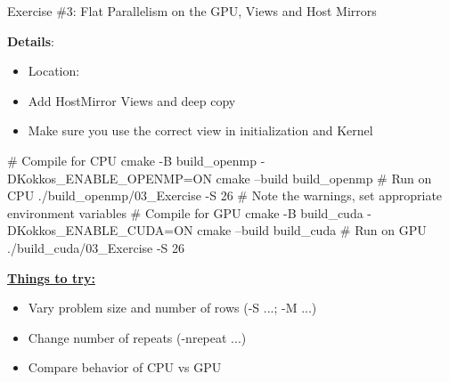 
\begin{frame}[fragile]{Exercise \#3: Flat Parallelism on the GPU, Views and Host Mirrors}

  \textbf{Details}:
  \begin{scriptsize}
  \begin{itemize}
\item Location: 
\item Add HostMirror Views and deep copy
\item Make sure you use the correct view in initialization and Kernel
\end{itemize}
  \end{scriptsize}

\begin{code}
  # Compile for CPU
  cmake -B build_openmp -DKokkos_ENABLE_OPENMP=ON
  cmake --build build_openmp
  # Run on CPU
  ./build_openmp/03_Exercise -S 26
  # Note the warnings, set appropriate environment variables
  # Compile for GPU
  cmake -B build_cuda -DKokkos_ENABLE_CUDA=ON
  cmake --build build_cuda
  # Run on GPU
  ./build_cuda/03_Exercise -S 26
\end{code}

  \ul{\textbf{Things to try:}}
  \begin{scriptsize}
  \begin{itemize}
  \item Vary problem size and number of rows (-S ...; -M ...)
  \item Change number of repeats (-nrepeat ...)
  \item Compare behavior of CPU vs GPU
  \end{itemize}
  \end{scriptsize}



\end{frame}


